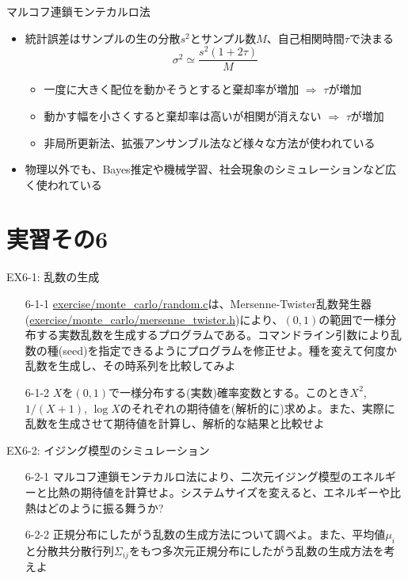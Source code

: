 \documentclass[dvipdfmx]{beamer}
\begin{document}
\begin{frame}[t,fragile]{マルコフ連鎖モンテカルロ法}
  \begin{itemize}
  \item 統計誤差はサンプルの生の分散$s^2$とサンプル数$M$、自己相関時間$\tau$で決まる
    \[
    \sigma^2 \simeq \frac{s^2 (1+2\tau)}{M}
    \]
    \begin{itemize}
    \item 一度に大きく配位を動かそうとすると棄却率が増加 $\Rightarrow$ $\tau$が増加
    \item 動かす幅を小さくすると棄却率は高いが相関が消えない $\Rightarrow$ $\tau$が増加
    \item 非局所更新法、拡張アンサンブル法など様々な方法が使われている
    \end{itemize}
  \item 物理以外でも、Bayes推定や機械学習、社会現象のシミュレーションなど広く使われている
  \end{itemize}
\end{frame}

\section{実習その6}

\begin{frame}[t,fragile]{EX6-1: 乱数の生成}
  \begin{itemize}
  \item[6-1-1] \href{https://github.com/todo-group/computer-experiments/exercise/monte_carlo/random.c}{exercise/monte\_carlo/random.c}は、Mersenne-Twister乱数発生器(\href{https://github.com/todo-group/computer-experiments/exercise/monte_carlo/mersenne_twister.c}{exercise/monte\_carlo/mersenne\_twister.h})により、$(0,1)$の範囲で一様分布する実数乱数を生成するプログラムである。コマンドライン引数により乱数の種(seed)を指定できるようにプログラムを修正せよ。種を変えて何度か乱数を生成し、その時系列を比較してみよ
  \item[6-1-2] $X$を$(0,1)$で一様分布する(実数)確率変数とする。このとき$X^2$, $1/(X+1)$, $\log X$のそれぞれの期待値を(解析的に)求めよ。また、実際に乱数を生成させて期待値を計算し、解析的な結果と比較せよ
  \end{itemize}
\end{frame}

\begin{frame}[t,fragile]{EX6-2: イジング模型のシミュレーション}
  \begin{itemize}
  \item[6-2-1] マルコフ連鎖モンテカルロ法により、二次元イジング模型のエネルギーと比熱の期待値を計算せよ。システムサイズを変えると、エネルギーや比熱はどのように振る舞うか?
  \item[6-2-2] 正規分布にしたがう乱数の生成方法について調べよ。また、平均値$\mu_i$と分散共分散行列$\Sigma_{ij}$をもつ多次元正規分布にしたがう乱数の生成方法を考えよ
  \end{itemize}
\end{frame}
\end{document}
